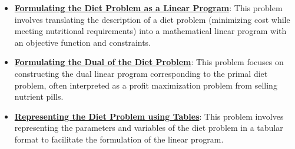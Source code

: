 \documentclass{article}%
\begin{document}
\begin{itemize}[leftmargin=*]%
\item \href{https://www.math.purdue.edu/~yipn/421/2024-09-19-DualityExamples.pdf#page=5}{\textbf{Formulating the Diet Problem as a Linear Program}}: This problem involves translating the description of a diet problem (minimizing cost while meeting nutritional requirements) into a mathematical linear program with an objective function and constraints.%
\item \href{https://www.math.purdue.edu/~yipn/421/2024-09-19-DualityExamples.pdf#page=8}{\textbf{Formulating the Dual of the Diet Problem}}: This problem focuses on constructing the dual linear program corresponding to the primal diet problem, often interpreted as a profit maximization problem from selling nutrient pills.%
\item \href{https://www.math.purdue.edu/~yipn/421/2024-09-19-DualityExamples.pdf#page=3}{\textbf{Representing the Diet Problem using Tables}}: This problem involves representing the parameters and variables of the diet problem in a tabular format to facilitate the formulation of the linear program.%
\end{itemize}%
\end{document}
